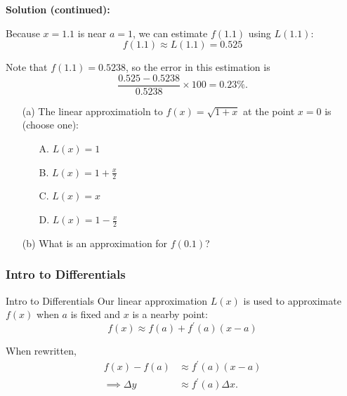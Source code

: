 \documentclass[cal1spr16Lectures.tex]{subfiles}
\begin{document}
\begin{frame}
\small
{\bf Solution (continued):}

\bigskip

Because $x=1.1$ is near $a=1$, we can estimate $f(1.1)$ using $L(1.1)$:
$$f(1.1) \approx L(1.1)= 0.525$$

\bigskip

Note that $f(1.1)=0.5238$, so the error in this estimation is
$$\dfrac{0.525-0.5238}{0.5238} \times 100=0.23 \%.$$
\end{frame}

\begin{frame}
\begin{exe}
\begin{itemize}
\item[(a)] The linear approximatioln to $f(x)=\sqrt{1+x}$ at the point $x=0$ is (choose one):
	\begin{itemize}
	\item[A. ]$L(x)=1$
	\item[B. ]$L(x)=1+\textstyle\frac{x}{2}$
	\item[C. ]$L(x)=x$
	\item[D. ]$L(x)=1-\textstyle\frac{x}{2}$
	\end{itemize}
\item[(b)] What is an approximation for $f(0.1)$?
\end{itemize}
	\end{exe}
\end{frame}

\subsubsection{Intro to Differentials}

\begin{frame}{\small Intro to Differentials}
\small
Our linear approximation $L(x)$ is used to approximate $f(x)$ when $a$ is fixed and $x$ is a nearby point:
\[f(x) \approx f(a)+f^{\prime}(a)(x-a)\]

\vspace{1pc}
When rewritten,
\begin{align*}
f(x)-f(a) & \approx f^{\prime}(a)(x-a) \\[0.5pc]
\implies \Delta y & \approx f^{\prime}(a) \Delta x.
\end{align*}
\end{frame}
\end{document}
